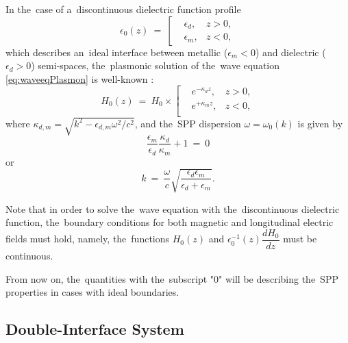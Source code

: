 In the~case of a~discontinuous dielectric function profile
\begin{equation}
\label{eq:idealeps1Plasmon}
\epsilon_0(z)~=~\left[
\begin{aligned}
&\epsilon_d, &z>0,\\
&\epsilon_m, &z<0,
\end{aligned}
\right.
\end{equation}
which describes an~ideal interface between metallic ($\epsilon_m<0$) and dielectric ($\epsilon_d>0$) semi-spaces, the~plasmonic solution of the~wave equation \cref{eq:waveeqPlasmon} is well-known \cite{zayats}:
\begin{equation}
\label{eq:idealeps1HfieldPlasmon}
H_0(z)~=~H_0 \times \left[
\begin{aligned}
&e^{-\kappa_d z}, &z>0,\\
&e^{+\kappa_m z}, &z<0,\\
\end{aligned}
\right.
\end{equation}
where $\kappa_{d,m} = \sqrt{k^2-\epsilon_{d,m}\omega^2/c^2}$, and the~SPP dispersion $\omega=\omega_0(k)$ is given by
\begin{equation}
\label{eq:idealeps1dispPlasmon_2}
\frac{\epsilon_m}{\epsilon_{d}}\frac{\kappa_{d}}{\kappa_m}+1~=~0
\end{equation}
or
\begin{equation}
\label{eq:idealeps1dispPlasmon}
k~=~\frac{\omega}{c}\sqrt{\frac{\epsilon_d\epsilon_m}{\epsilon_d+\epsilon_m}}.
\end{equation}

Note that in order to solve the~wave equation with the~discontinuous dielectric function, the~boundary conditions for both magnetic and longitudinal electric fields must hold, namely, the~functions $H_0(z)$ and $\epsilon_0^{-1}(z)\dfrac{dH_0}{dz}$ must be continuous.

From now on, the~quantities with the~subscript "$0$" will be describing the~SPP properties in cases with ideal boundaries.



\subsection{Double-Interface System}

